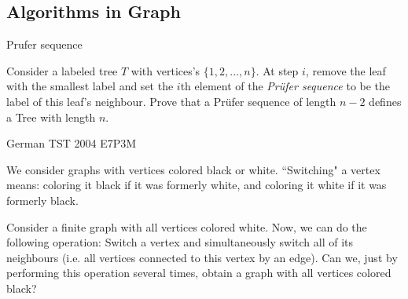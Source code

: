 \newpage
\subsection{Algorithms in Graph}


\begin{minipage}{.5\linewidth}
    \label{definition:cut_graph_theory}
\end{minipage}\hfill%
\begin{minipage}{.49\linewidth}
    \begin{figure}[H]
        \begin{center}
            \hspace{1em}
        \end{center}
    \end{figure}
\end{minipage}



\begin{minipage}{.55\linewidth}
    {Prufer sequence}{
        Consider a labeled tree $ T $ with vertices's $ \{1, 2, ..., n\} $. At
        step $ i $, remove the leaf with the smallest label and set the $ i $th
        element of the \textit{Prüfer sequence} to be the label of this leaf's
        neighbour. Prove that a Prüfer sequence of length $ n-2 $ defines a Tree
        with length $ n $.

    }
\end{minipage}\hfill%
\begin{minipage}{.45\linewidth}
\end{minipage}




{German TST 2004 E7P3}{M}{
    We consider graphs with vertices colored black or white. ``Switching" a
    vertex means: coloring it black if it was formerly white, and coloring it
    white if it was formerly black.

    Consider a finite graph with all vertices colored white. Now, we can do the
    following operation: Switch a vertex and simultaneously switch all of its
    neighbours (i.e. all vertices connected to this vertex by an edge). Can we,
    just by performing this operation several times, obtain a graph with all
    vertices colored black?

}\label{problem:induction_type1_30}

